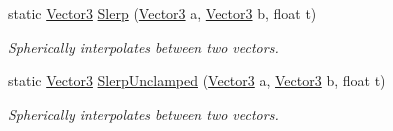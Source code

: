 \begin{DoxyCompactItemize}
static \mbox{\hyperlink{class_lua_1_1_vector3}{Vector3}} \mbox{\hyperlink{class_lua_1_1_vector3_a952dff0d8cc76a32589c2020e957adbf}{Slerp}} (\mbox{\hyperlink{class_lua_1_1_vector3}{Vector3}} a, \mbox{\hyperlink{class_lua_1_1_vector3}{Vector3}} b, float t)
\begin{DoxyCompactList}\small\item\em Spherically interpolates between two vectors. \end{DoxyCompactList}\item 
static \mbox{\hyperlink{class_lua_1_1_vector3}{Vector3}} \mbox{\hyperlink{class_lua_1_1_vector3_a951d3fea17d487e6c7a27d842fcaf3f7}{Slerp\+Unclamped}} (\mbox{\hyperlink{class_lua_1_1_vector3}{Vector3}} a, \mbox{\hyperlink{class_lua_1_1_vector3}{Vector3}} b, float t)
\begin{DoxyCompactList}\small\item\em Spherically interpolates between two vectors. \end{DoxyCompactList}\end{DoxyCompactItemize}
